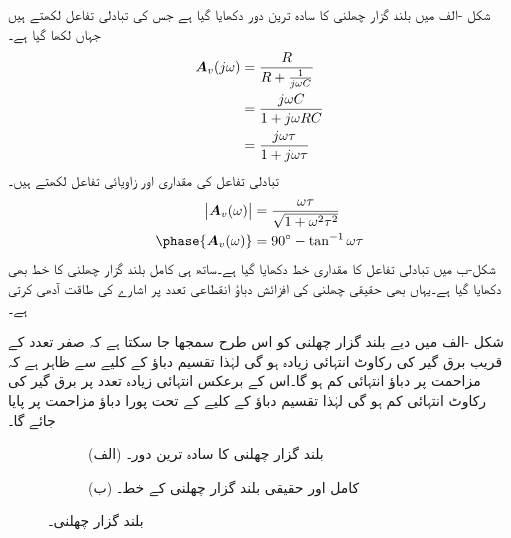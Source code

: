 شکل -الف میں بلند گزار چھلنی کا سادہ ترین دور دکھایا گیا ہے جس کی تبادلی تفاعل لکھتے ہیں جہاں  لکھا گیا ہے۔
\begin{align*}
{\ensuremath{{\boldsymbol{A}}}}_v(j\omega)&=\frac{R}{R+\frac{1}{j\omega C}}\\
&=\frac{j\omega C}{1+j\omega RC}\\
&=\frac{j\omega \tau}{1+j\omega \tau}
\end{align*}
تبادلی تفاعل کی مقداری اور زاویائی تفاعل لکھتے ہیں۔
\begin{align}
\abs{\bA_v(\omega)}&=\frac{\omega \tau}{\sqrt{1+\omega^2 \tau^2}}\\
\phase{\bA_v(\omega)}&=90^{\circ}-\tan^{-1}\omega \tau
\end{align}
شکل-ب میں تبادلی تفاعل کا مقداری خط دکھایا گیا ہے۔ساتھ ہی کامل بلند گزار چھلنی کا خط بھی دکھایا گیا ہے۔یہاں بھی حقیقی چھلنی کی افزائش دباؤ انقطاعی تعدد پر اشارے کی طاقت آدھی کرتی ہے۔


شکل -الف میں دیے بلند گزار چھلنی کو اس طرح سمجھا جا سکتا ہے کہ صفر تعدد کے قریب برق گیر کی رکاوٹ انتہائی زیادہ ہو گی لہٰذا تقسیم دباؤ کے کلیے سے ظاہر ہے کہ مزاحمت پر  دباؤ انتہائی کم ہو گا۔اس کے برعکس انتہائی زیادہ  تعدد پر برق گیر کی رکاوٹ انتہائی کم ہو گی لہٰذا تقسیم دباؤ کے کلیے کے تحت پورا دباؤ مزاحمت پر پایا جائے گا۔

\begin{figure}
\centering
\begin{subfigure}{0.33\textwidth}
\centering
{}
\caption*{(الف) بلند گزار چھلنی کا سادہ ترین دور۔}
\end{subfigure}%
\begin{subfigure}{0.66\textwidth}
\centering
{}
\caption*{(ب) کامل اور حقیقی بلند گزار چھلنی کے خط۔}
\end{subfigure}
\caption{بلند گزار چھلنی۔}
\label{شکل_تعدد_کامل_بلند_گزار_خصلت}
\end{figure}

